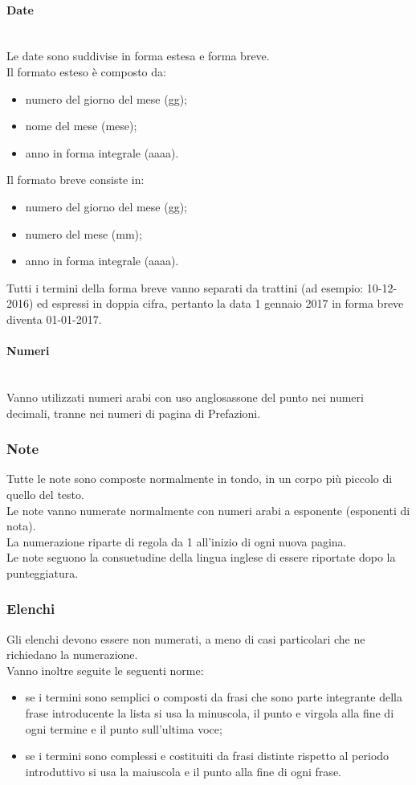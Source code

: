 \paragraph{Date} \mbox{} \\
Le date sono suddivise in forma estesa e forma breve.\\
Il formato esteso è composto da:
\begin{itemize}
	\item numero del giorno del mese (gg);
	\item nome del mese (mese);
	\item anno in forma integrale (aaaa).
\end{itemize}
Il formato breve consiste in:
\begin{itemize}
	\item numero del giorno del mese (gg);
	\item numero del mese (mm);
	\item anno in forma integrale (aaaa).
\end{itemize}
Tutti i termini della forma breve vanno separati da trattini (ad esempio: 10-12-2016) ed espressi in doppia cifra, pertanto la data 1 gennaio 2017 in forma breve diventa 01-01-2017.


\paragraph{Numeri} \mbox{} \\
Vanno utilizzati numeri arabi con uso anglosassone del punto nei numeri decimali, tranne nei numeri di pagina di Prefazioni.

\subsubsection{Note}
Tutte le note sono composte normalmente in tondo, in un corpo più piccolo di quello del testo.\\
Le note vanno numerate normalmente con numeri arabi a esponente (esponenti di nota).\\
La numerazione riparte di regola da 1 all'inizio di ogni nuova pagina.\\
Le note seguono la consuetudine della lingua inglese di essere riportate dopo la punteggiatura.

\subsubsection{Elenchi}
Gli elenchi devono essere non numerati, a meno di casi particolari che ne richiedano la numerazione.\\
Vanno inoltre seguite le seguenti norme:
\begin{itemize}
	\item se i termini sono semplici o composti da frasi che sono parte integrante della frase introducente la lista si usa la minuscola, il punto e virgola alla fine di ogni termine e il punto sull'ultima voce;
	\item se i termini sono complessi e costituiti da frasi distinte rispetto al periodo introduttivo si usa la maiuscola e il punto alla fine di ogni frase.
\end{itemize}

